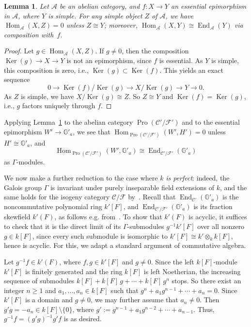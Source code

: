 \documentclass[11pt]{article}
\newtheorem{lemm}[theo]{Lemma}
\theoremstyle{definition}
\numberwithin{equation}{section}
\newcommand\bG{{\mathbb G}}
\newcommand\cA{{\mathcal A}}
\newcommand\cC{{\mathcal C}}
\newcommand\cF{{\mathcal F}}
\DeclareMathOperator{\End}{End}
\DeclareMathOperator{\Hom}{Hom}
\DeclareMathOperator{\Ker}{Ker}
\DeclareMathOperator{\Pro}{Pro}
\theoremstyle{remark}
\begin{document}
\begin{lemm}\label{lem:top}
Let $\cA$ be an abelian category, and $f : X \to Y$ an essential epimorphism in $\cA$, where $Y$ is simple. For any simple object $Z$ of $\cA$, we have $\Hom_{\cA}(X,Z) = 0$ unless $Z \cong Y$; moreover, $\Hom_{\cA}(X,Y) \cong \End_{\cA}(Y)$ via composition with~$f$.
\end{lemm}

\begin{proof}
Let $g \in \Hom_{\cA}(X,Z)$. If $g \neq 0$, then the composition $\Ker(g) \to X \to Y$ is not an epimorphism, since $f$ is essential. As $Y$ is simple, this composition is zero, i.e., $\Ker(g) \subset \Ker(f)$. This yields an exact sequence
\[
0 \longrightarrow \Ker(f)/\Ker(g) \longrightarrow X/\Ker(g) \longrightarrow Y \longrightarrow 0.
\]
As $Z$ is simple, we have $X/\Ker(g) \cong Z$. So $Z \cong Y$ and $\Ker(f) = \Ker(g)$, i.e., $g$ factors uniquely through $f$.
\end{proof}

Applying Lemma~\ref{lem:top} to the abelian category $\Pro(\cC'/\cF')$ and to the essential epimorphism $W' \to \bG'_a$, we see that $\Hom_{\Pro(\cC'/\cF')}(W',H') = 0$ unless $H' \cong \bG'_a$, and
\[
\Hom_{\Pro(\cC'/\cF')}(W',\bG'_a)
\cong \End_{\cC'/\cF'}(\bG'_a)
\]
as $\Gamma$-modules.

We now make a further reduction to the case where $k$ \emph{is perfect}: indeed, the Galois group $\Gamma$ is invariant under purely inseparable field extensions of $k$, and the same holds for the isogeny category $\cC/\cF$ by~\cite[Thm.~3.11]{Br17a}. Recall that $\End_{\cC'}(\bG'_a)$ is the noncommutative polynomial ring $k'[F]$, and $\End_{\cC'/\cF'}(\bG'_a)$ is its fraction skewfield $k'(F)$, as follows e.g. from~\cite[V.3.6.7]{DG}. To show that $k'(F)$ is acyclic, it suffices to check that it is the direct limit of its $\Gamma$-submodules $g^{-1} k'[F]$ over all nonzero $g \in k[F]$, since every such submodule is isomorphic to $k'[F] \cong k' \otimes_k k[F]$, hence is acyclic. For this, we adapt a standard argument of commutative algebra.

Let $g^{-1}f \in k'(F)$, where $f,g \in k'[F]$ and $g \neq 0$. Since the left $k[F]$-module $k'[F]$ is finitely generated and the ring $k[F]$ is left Noetherian, the increasing sequence of submodules $k[F] + k[F]\, g + \cdots + k[F] \, g^n$ stops. So there exist an integer $n \geq 1$ and $a_1,\ldots, a_n \in k[F]$ such that $g^n + a_1 g^{n-1} + \cdots + a_n = 0$. Since $k'[F]$ is a domain and $g \neq 0$, we may further assume that $a_n \neq 0$. Then $g' g = - a_n \in k[F] \setminus \{ 0 \}$, where $g' := g^{n-1} + a_1 g^{n-2} + \cdots + a_{n-1}$. Thus, $g^{-1} f = (g'g)^{-1} g'f$ is as desired.
\end{document}
